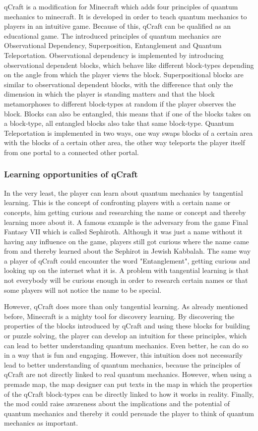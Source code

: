 \documentclass[12pt]{report} %
\begin{document}
qCraft is a modification for Minecraft which adds four principles of quantum mechanics to minecraft. It is developed in order to teach quantum mechanics to players in an intuitive game. Because of this, qCraft can be qualified as an educational game. The introduced principles of quantum mechanics are Observational Dependency, Superposition, Entanglement and Quantum Teleportation. Observational dependency is implemented by introducing observational dependent blocks, which behave like different block-types depending on the angle from which the player views the block. Superpositional blocks are similar to observational dependent blocks, with the difference that only the dimension in which the player is standing matters and that the block metamorphoses to different block-types at random if the player observes the block. Blocks can also be entangled, this means that if one of the blocks takes on a block-type, all entangled blocks also take that same block-type. Quantum Teleportation is implemented in two ways, one way swaps blocks of a certain area with the blocks of a certain other area, the other way teleports the player itself from one portal to a connected other portal.

\subsubsection{Learning opportunities of qCraft}

In the very least, the player can learn about quantum mechanics by tangential learning. This is the concept of confronting players with a certain name or concepts, him getting curious and researching the name or concept and thereby learning more about it. A famous example is the adversary from the game Final Fantasy VII which is called Sephiroth. Although it was just a name without it having any influence on the game, players still got curious where the name came from and thereby learned about the Sephirot in Jewish Kabbalah. The same way a player of qCraft could encounter the word "Entanglement", getting curious and looking up on the internet what it is. A problem with tangential learning is that not everybody will be curious enough in order to research certain names or that some players will not notice the name to be special.

However, qCraft does more than only tangential learning. As already mentioned before, Minecraft is a mighty tool for discovery learning. By discovering the properties of the blocks introduced by qCraft and using these blocks for building or puzzle solving, the player can develop an intuition for these principles, which can lead to better understanding quantum mechanics. Even better, he can do so in a way that is fun and engaging. However, this intuition does not necessarily lead to better understanding of quantum mechanics, because the principles of qCraft are not directly linked to real quantum mechanics. However, when using a premade map, the map designer can put texts in the map in which the properties of the qCraft block-types can be directly linked to how it works in reality. Finally, the mod could raise awareness about the implications and the potential of quantum mechanics and thereby it could persuade the player to think of quantum mechanics as important.
\end{document}
